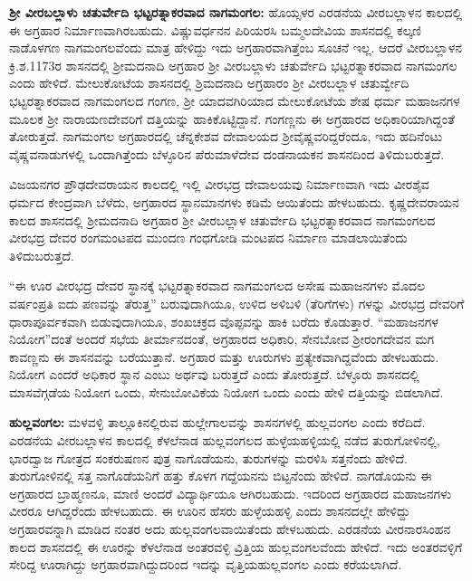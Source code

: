 \textbf{ಶ‍್ರೀ ವೀರಬಲ್ಲಾಳು ಚತುರ್ವೇದಿ ಭಟ್ಟರತ್ನಾಕರವಾದ ನಾಗಮಂಗಲ:} ಹೊಯ್ಸಳರ ಎರಡನೆಯ ವೀರಬಲ್ಲಾಳನ ಕಾಲದಲ್ಲಿ ಈ ಅಗ್ರಹಾರ ನಿರ್ಮಾಣವಾಗಿರಬಹುದು. ವಿಷ್ಣುವರ್ಧನನ ಪಿರಿಯರಸಿ ಬಮ್ಮಲದೇವಿಯ ಶಾಸನದಲ್ಲಿ ಕಲ್ಕಣಿ ನಾಡೊಳಗಣ ನಾಗಮಂಗಲವೆಂದು ಮಾತ್ರ ಹೇಳಿದ್ದು ಇದು ಅಗ್ರಹಾರವಾಗಿತ್ತೆಂಬ ಸೂಚನೆ ಇಲ್ಲ. ಆದರೆ ವೀರಬಲ್ಲಾಳನ ಕ್ರಿ.ಶ.1173ರ ಶಾಸನದಲ್ಲಿ ಶ‍್ರೀಮದನಾದಿ ಅಗ್ರಹಾರ ಶ‍್ರೀ ವೀರಬಲ್ಲಾಳು ಚತುರ್ವೇದಿ ಭಟ್ಟರತ್ನಾಕರವಾದ ನಾಗಮಂಗಲ ಎಂದು ಹೇಳಿದೆ. ಮೇಲುಕೋಟೆಯ ಶಾಸನದಲ್ಲಿ ಶ್ರಿಮದನಾದಿ ಅಗ್ರಹಾರಂ ಶ‍್ರೀ ವೀರಬಲ್ಲಾಳ ಚತುರ್ವ್ವೇದಿ ಭಟ್ಟರತ್ನಾಕರವಾದ ನಾಗಮಂಗಲದ ಗಂಗಣ, ಶ‍್ರೀ ಯಾದವಗಿರಿಯಾದ ಮೇಲುಕೋಟೆಯ ಶೇಷ ಧರ್ಮ ಮಹಾಜನಗಳ ಮೂಲಕ ಶ‍್ರೀ ನಾರಾಯಣದೇವರಿಗೆ ದತ್ತಿಯನ್ನು ಹಾಕಿಕೊಟ್ಟಿದ್ದಾನೆ. ಗಂಗಣ್ಣನು ಈ ಅಗ್ರಹಾರದ ಅಧಿಕಾರಿಯಾಗಿದ್ದಂತೆ ತೋರುತ್ತದೆ. ನಾಗಮಂಗಲ ಅಗ್ರಹಾರದಲ್ಲಿ ಚೆನ್ನಕೇಶವ ದೇವಾಲಯದ ಶ‍್ರೀವೈಷ್ಣವರಿದ್ದರೆಂದೂ, ಇದು ಹದಿನೆಂಟು ವೈಷ್ಣವನಾಡುಗಳಲ್ಲಿ ಒಂದಾಗಿತ್ತೆಂದು ಬೆಳ್ಳೂರಿನ ಪೆರುಮಾಳೆದೇವ ದಂಡನಾಯಕನ ಶಾಸನದಿಂದ ತಿಳಿದುಬರುತ್ತದೆ.

ವಿಜಯನಗರ ಪ್ರೌಢದೇವರಾಯನ ಕಾಲದಲ್ಲಿ ಇಲ್ಲಿ ವೀರಭದ್ರ ದೇವಾಲಯವು ನಿರ್ಮಾಣವಾಗಿ ಇದು ವೀರಶೈವ ಧರ್ಮದ ಕೇಂದ್ರವಾಗಿ ಬೆಳೆದು, ಅಗ್ರಹಾರದ ಸ್ಥಾನಮಾನಗಳು ಕಡಿಮೆ ಆಯಿತೆಂದು ಹೇಳಬಹುದು. ಕೃಷ್ಣದೇವರಾಯನ ಕಾಲದ ಶಾಸನದಲ್ಲಿ ಶ‍್ರೀಮದನಾದಿ ಅಗ್ರಹಾರ ಶ‍್ರೀ ವೀರಬಲ್ಲಾಳ ಚತುರ್ವೇದಿ ಭಟ್ಟರತ್ನಾಕರವಾದ ನಾಗಮಂಗಲದ ವೀರಭದ್ರ ದೇವರ ರಂಗಮಂಟಪದ ಮುಂದಣ ಗಂಧಗೋಡಿ ಮಂಟಪದ ನಿರ್ಮಾಣ ಮಾಡಲಾಯಿತೆಂದು ತಿಳಿದುಬರುತ್ತದೆ.

“ಈ ಊರ ವೀರಭದ್ರ ದೇವರ ಸ್ಥಾನಕ್ಕೆ ಭಟ್ಟರತ್ನಾಕರವಾದ ನಾಗಮಂಗಲದ ಅಸೇಷ ಮಹಾಜನಗಳು ಮೊದಲ ವರ್ಷಂಪ್ರತಿ ಐದು ಪಣವನ್ನು ತೆರುತ್ತ” ಬರುವುದಾಗಿಯೂ, ಉಳಿದ ಅಳಿಬಳಿ (ತೆರಿಗೆಗಳು) ಗಳನ್ನು ವೀರಭದ್ರ ದೇವರಿಗೆ ಧಾರಾಪೂರ್ವಕವಾಗಿ ಬಿಡುವುದಾಗಿಯೂ, ಶಂಖಚಕ್ರದ ವೊಪ್ಪವನ್ನು ಹಾಕಿ ಬರೆದು ಕೊಡುತ್ತಾರೆ. “ಮಹಾಜನಗಳ ನಿಯೋಗ”ದಂತೆ ಅಂದರೆ ಸಭೆಯ ತೀರ್ಮಾನದಂತೆ, ಅಗ್ರಹಾರದ ಅಧಿಕಾರಿ, ಸೇನಬೋವ ಶ‍್ರೀರಂಗದೇವನ ಮಗ ಕಾವಣ್ಣನು ಈ ಶಾಸನವನ್ನು ಬರೆಯುತ್ತಾನೆ. ಅಗ್ರಹಾರ ಮತ್ತು ಊರುಗಳು ಪ್ರತ್ಯೇಕವಾಗಿದ್ದವೆಂದು ಹೇಳಬಹುದು. ನಿಯೋಗ ಎಂದರೆ ಅಧಿಕಾರ ಸ್ಥಾನ ಎಂಬು ಅರ್ಥವು ಬರುತ್ತದೆ ಎಂದು ತೋರುತ್ತದೆ. ಬೆಳ್ಳೂರು ಶಾಸನದಲ್ಲಿ ಮಾಸವೆಗ್ಗಡೆಯ ನಿಯೋಗ ಒಂದು, ಸೇನುಬೋವಿಕೆಯ ನಿಯೋಗ ಒಂದು ಎಂದು ಹೇಳಿ ದತ್ತಿಯನ್ನು ಬಿಡಲಾಗಿದೆ.

\textbf{ಹುಲ್ಲವಂಗಲ:} ಮಳವಳ್ಳಿ ತಾಲ್ಲೂಕಿನಲ್ಲಿರುವ ಹುಲ್ಲೇಗಾಲವನ್ನು ಶಾಸನಗಳಲ್ಲಿ ಹುಲ್ಲವಂಗಲ ಎಂದು ಕರೆದಿದೆ. ಎರಡನೆಯ ವೀರಬಲ್ಲಾಳನ ಕಾಲದಲ್ಲಿ ಕೆಳಲೆನಾಡ ಹುಲ್ಲವಂಗಲದ ಹುಳ್ಳೆಯಹಳ್ಳಿಯಲ್ಲಿ ನಡೆದ ತುರುಗೋಳಿನಲ್ಲಿ, ಭಾರದ್ವಾಜ ಗೋತ್ರದ ಸಂಕರುಷಣನ ಪುತ್ರ ನಾಗೊಡೆಯನು, ತುರುಗಳನ್ನು ಮರಳಿಸಿ ಸತ್ತನೆಂದು ಹೇಳಿದೆ. ತುರುಗೋಳಿನಲ್ಲಿ ಸತ್ತ ನಾಗೊಡೆಯನಿಗೆ ಹತ್ತು ಕೊಳಗ ಗದ್ದೆಯನನು ಬಿಟ್ಟನೆಂದು ಹೇಳಿದೆ. ನಾಗಡೊಯನು ಈ ಅಗ್ರಹಾರದ ಬ್ರಾಹ್ಮಣನೂ, ಮಾಣಿ ಅಂದರೆ ವಿದ್ಯಾರ್ಥಿಯೂ ಆಗಿರಬಹುದು. ಇದರಿಂದ ಅಗ್ರಹಾರದ ಮಹಾಜನಗಳು ವೀರರೂ ಆಗಿದ್ದರೆಂದು ಹೇಳಬಹುದು. ಈ ಊರಿನ ಹೆಸರು ಹುಳ್ಳೆಯಹಳ್ಳಿ ಎಂದು ಶಾಸನದಲ್ಲೇ ಹೇಳಿದ್ದು ಅಗ್ರಹಾರವನ್ನಾಗಿ ಮಾಡಿದ ನಂತರ ಅದು ಹುಲ್ಲವಂಗಲವಾಯಿತೆಂದು ಹೇಳಬಹುದು. ಎರಡನೆಯ ವೀರನಾರಸಿಂಹನ ಕಾಲದ ಶಾಸನದಲ್ಲಿ ಈ ಊರನ್ನು ಕೆಳಲೆನಾಡ ಅಂತರವಳ್ಳಿ ವ್ರಿತ್ತಿಯ ಹುಲ್ಲವಂಗಲವೆಂದು ಹೇಳಿದೆ. ಇದು ಅಂತರವಳ್ಳಿಗೆ ಸೇರಿದ್ದ ಊರಾಗಿದ್ದು ಅಗ್ರಹಾರವಾಗಿದ್ದುದರಿಂದ ಇದನ್ನು ವೃತ್ತಿಯಹುಲ್ಲವಂಗಲ ಎಂದು ಕರೆಯಲಾಗಿದೆ.

